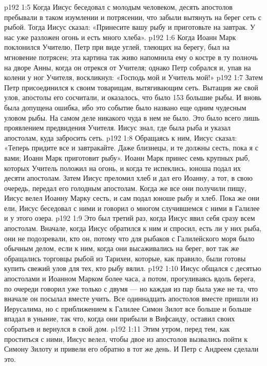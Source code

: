 \vs p192 1:5 Когда Иисус беседовал с молодым человеком, десять апостолов пребывали в таком изумлении и потрясении, что забыли вытянуть на берег сеть с рыбой. Тогда Иисус сказал: «Принесите вашу рыбу и приготовьте на завтрак. У нас уже разложен огонь и есть много хлеба».
\vs p192 1:6 Когда Иоанн Марк поклонился Учителю, Петр при виде углей, тлеющих на берегу, был на мгновение потрясен; эта картина так живо напомнила ему о костре в ту полночь на дворе Анны, когда он отрекся от Учителя; однако Петр собрался и, упав на колени у ног Учителя, воскликнул: «Господь мой и Учитель мой!»
\vs p192 1:7 Затем Петр присоединился к своим товарищам, вытягивающим сеть. Вытащив же свой улов, апостолы его сосчитали, и оказалось, что было 153 большие рыбы. И вновь была допущена ошибка, ибо это событие было названо еще одним чудесным уловом рыбы. На самом деле никакого чуда в нем не было. Это было всего лишь проявлением предвидения Учителя. Иисус знал, где была рыба и указал апостолам, куда забросить сеть.
\vs p192 1:8 Обращаясь к ним, Иисус сказал: «Теперь придите все и завтракайте. Даже близнецы, и те должны сесть, пока я с вами; Иоанн Марк приготовит рыбу». Иоанн Марк принес семь крупных рыб, которых Учитель положил на огонь, и когда те испеклись, юноша подал их десяти апостолам. Затем Иисус преломил хлеб и дал его Иоанну, а тот, в свою очередь, передал его голодным апостолам. Когда же все они получили пищу, Иисус велел Иоанну Марку сесть, и сам подал юноше рыбу и хлеб. Пока же они ели, Иисус беседовал с ними и говорил о многом случившемся с ними в Галилее и у этого озера.
\vs p192 1:9 \pc Это был третий раз, когда Иисус явил себя сразу всем апостолам. Вначале, когда Иисус обратился к ним и спросил, есть ли у них рыба, они не подозревали, кто он, потому что для рыбаков с Галилейского моря было обычным делом, если к ним, когда они высаживались на берег, вот так же обращались торговцы рыбой из Тарихеи, которые, как правило, были готовы купить свежий улов для тех, кто рыбу вялил.
\vs p192 1:10 \pc Иисус общался с десятью апостолами и Иоанном Марком более часа, а потом, прогуливаясь вдоль берега, по очереди говорил уже только с двумя --- но каждая из пар была уже не та, что вначале он посылал вместе учить. Все одиннадцать апостолов вместе пришли из Иерусалима, но с приближением к Галилее Симон Зилот все больше и больше впадал в уныние, так что, когда они прибыли в Вифсаиду, оставил своих собратьев и вернулся в свой дом.
\vs p192 1:11 Этим утром, перед тем, как проститься с ними, Иисус велел, чтобы двое из апостолов вызвались пойти к Симону Зилоту и привели его обратно в тот же день. И Петр с Андреем сделали это.
